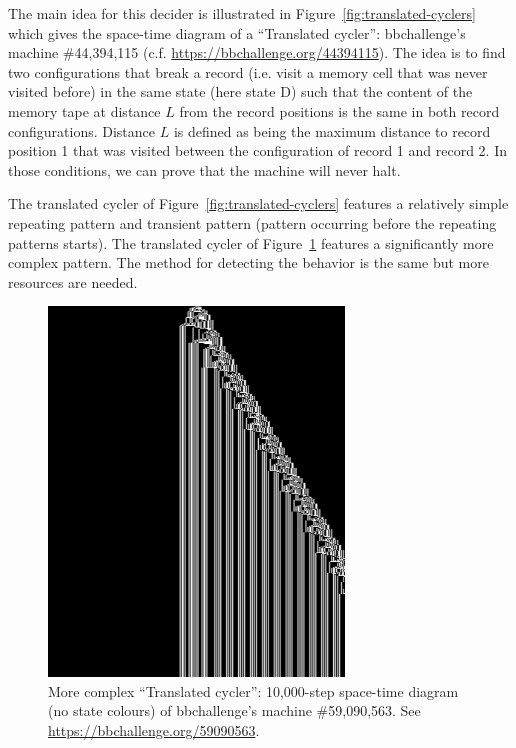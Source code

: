 The main idea for this decider is illustrated in Figure~\ref{fig:translated-cyclers} which gives the space-time diagram of a ``Translated cycler'': bbchallenge's machine \#44,394,115 (c.f. \url{https://bbchallenge.org/44394115}). The idea is to find two configurations that break a record (i.e. visit a memory cell that was never visited before) in the same state (here state \textcolor{colorD}{D}) such that the content of the memory tape at distance $L$ from the record positions is the same in both record configurations. Distance $L$ is defined as being the maximum distance to record position 1 that was visited between the configuration of record 1 and record 2. In those conditions, we can prove that the machine will never halt.

The translated cycler of Figure~\ref{fig:translated-cyclers} features a relatively simple repeating pattern and transient pattern (pattern occurring before the repeating patterns starts). The translated cycler of Figure~\ref{fig:translated-cyclers-more} features a significantly more complex pattern. The method for detecting the behavior is the same but more resources are needed.


\begin{figure}
  \centering
  \includegraphics[width=0.7\textwidth]{figures/space-time-diagrams/translated_cycler_59090563.png}

  \caption{More complex ``Translated cycler'': 10,000-step space-time diagram (no state colours) of bbchallenge's machine \#59,090,563. See \url{https://bbchallenge.org/59090563}.}\label{fig:translated-cyclers-more}
\end{figure}


